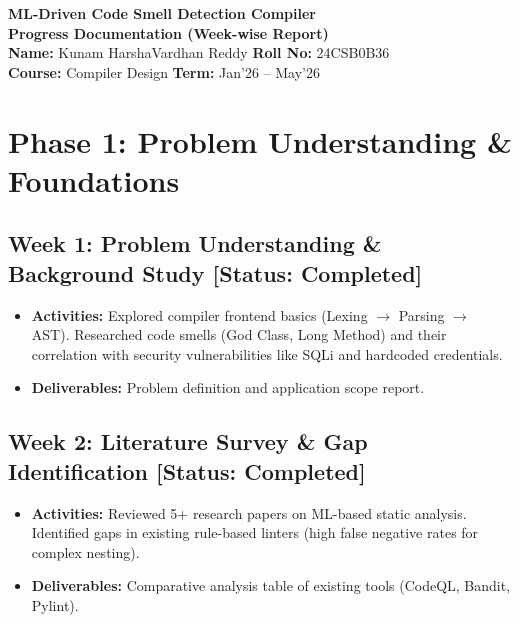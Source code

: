 \documentclass[12pt,a4paper]{article}
\begin{document}
\begin{center}
    {\LARGE \textbf{ML-Driven Code Smell Detection Compiler}} \\
    \vspace{5pt}
    {\large \textbf{Progress Documentation (Week-wise Report)}} \\
    \vspace{10pt}
    \textbf{Name:} Kunam HarshaVardhan Reddy \quad \textbf{Roll No:} 24CSB0B36 \\
    \textbf{Course:} Compiler Design \quad \textbf{Term:} Jan'26 -- May'26
\end{center}

\vspace{10pt}

\section{Phase 1: Problem Understanding \& Foundations}

\subsection*{Week 1: Problem Understanding \& Background Study [Status: Completed]}
\begin{itemize}[noitemsep,topsep=0pt]
    \item \textbf{Activities:} Explored compiler frontend basics (Lexing $\rightarrow$ Parsing $\rightarrow$ AST). Researched code smells (God Class, Long Method) and their correlation with security vulnerabilities like SQLi and hardcoded credentials.
    \item \textbf{Deliverables:} Problem definition and application scope report.
\end{itemize}

\subsection*{Week 2: Literature Survey \& Gap Identification [Status: Completed]}
\begin{itemize}[noitemsep,topsep=0pt]
    \item \textbf{Activities:} Reviewed 5+ research papers on ML-based static analysis. Identified gaps in existing rule-based linters (high false negative rates for complex nesting).
    \item \textbf{Deliverables:} Comparative analysis table of existing tools (CodeQL, Bandit, Pylint).
\end{itemize}
\end{document}
